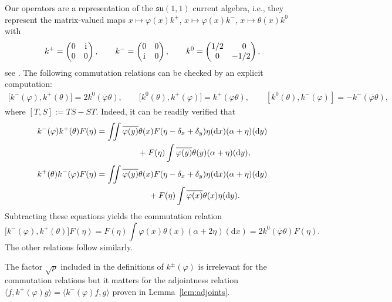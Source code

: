 \documentclass[10pt,a4paper]{amsart}
\numberwithin{equation}{section}
\newcommand{\dd}{\mathrm{d}} %
\newcommand{\la}{\langle}
\newcommand{\ra}{\rangle}
\newcommand{\1}{\mathbbm{1}}
\begin{document}
Our operators are a representation of the $\mathfrak{su}(1,1)$ current algebra, i.e., they represent the matrix-valued maps $x\mapsto \varphi(x) k^+$, $x\mapsto \overline{\varphi(x)} k^-$, $x\mapsto \theta(x) k^0$ with
\begin{align*}
 	k^+ = \begin{pmatrix} 0 & \mathrm i \\ 0 & 0 \end{pmatrix},\qquad
	k^- = \begin{pmatrix} 0 & 0 \\ \mathrm i & 0 \end{pmatrix},\qquad
	k^0 = \begin{pmatrix} 1/2 & \hphantom{-}0 \\ 0 & -1/2 \end{pmatrix},
\end{align*}
see \cite[Section~2.2]{algebraic_Floreani}.
The following commutation relations can be checked by an explicit computation:
\begin{gather*}
	\bigl[k^-(\varphi), k^+(\theta)\bigr] = 2 k^0(\overline{\varphi}\theta),\qquad
\bigl[k^0(\theta),k^+(\varphi)\bigr] = k^+(\varphi\theta),\qquad [k^0(\theta),k^-(\varphi)] = - k^-(\overline{\varphi}\theta),
\end{gather*}
where $[T, S] := TS - ST$.
Indeed, it can be readily verified that
\begin{gather*}
 k^-(\varphi) k^+(\theta) F(\eta) = \iint \overline{\varphi(y)} \theta(x) F(\eta - \delta_x + \delta_y) \eta(\dd x) (\alpha + \eta)(\dd y) \\
 \hphantom{k^-(\varphi) k^+(\theta) F(\eta) = \iint}{}
 + F(\eta) \int \overline{\varphi(y)} \theta(y) (\alpha + \eta)(\dd y), \\
 k^+(\theta) k^-(\varphi) F(\eta) = \iint \overline{\varphi(y)} \theta(x) F(\eta - \delta_x + \delta_y) \eta(\dd x) (\alpha + \eta)(\dd y) \\
 \hphantom{k^+(\theta) k^-(\varphi) F(\eta) =\iint}{}
 + F(\eta) \int \overline{\varphi(x)} \theta(x) \eta(\dd y).
\end{gather*}
Subtracting these equations yields the commutation relation
\[
\bigl[k^-(\varphi), k^+(\theta)\bigr] F(\eta) = F(\eta) \int \overline{\varphi(x)} \theta(x) (\alpha + 2\eta)(\dd x) = 2k^0(\overline{\varphi}\theta) F(\eta).
\]
 The other relations follow similarly.

The factor $\sqrt p$ included in the definitions of $k^\pm(\varphi)$ is irrelevant for the commutation relations but it matters for the adjointness relation $\la f, k^+(\varphi) g\ra = \la k^-(\varphi) f,g\ra$ proven in Lemma~\ref{lem:adjoints}.
\end{document}
